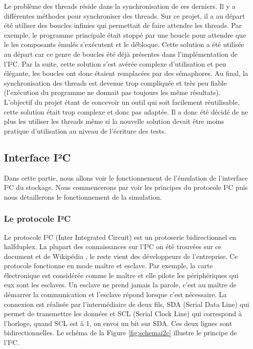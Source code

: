 \documentclass[a4paper]{article}
\begin{document}
Le problème des threads réside dans la synchronisation de ces derniers. Il y a
différentes méthodes pour synchroniser des threads. Sur ce projet, il a au
départ été utiliser des boucles infinies qui permettait de faire attendre les
threads. Par exemple, le programme principale était stoppé par une boucle pour
attendre que le les composants émulés s'exécutent et le débloque. Cette solution
a été utilisée au départ car ce genre de boucles été déjà présentes dans
l'implémentation de l'I²C. Par la suite, cette solution s'est avérée complexe
d'utilisation et peu élégante, les boucles ont donc étaient remplacées par des %
sémaphores. Au final, la synchronisation des threads est devenue trop compliquée
et très peu fiable (l'exécution du programme ne donnait pas toujours les même
résultats). L'objectif du projet étant de concevoir un outil qui soit facilement
réutilisable, cette solution était trop complexe et donc pas adaptée. Il a donc
été décidé de ne plus les utiliser les threads même si la nouvelle solution
devait être moins pratique d'utilisation au niveau de l'écriture des tests.
\subsection{Interface I²C}%

Dans cette partie, nous allons voir le fonctionnement de l'émulation de
l'interface I²C du stockage. Nous commencerons par voir les principes du
protocole I²C puis nous détaillerons le fonctionnement de la simulation.

\subsubsection*{Le protocole I²C}

Le protocole I²C (Inter Integrated Circuit) est un \gls{protoserie}
bidirectionnel en \gls{halfduplex}. La plupart des connaissances sur l'I²C on
été trouvées sur ce document \cite{mankar2014review} et de Wikipédia
\cite{frwiki:197726464}, le reste vient des développeurs de l'entreprise. Ce
protocole fonctionne en mode maître et esclave. Par exemple, la carte
électronique est considérée comme le maître et elle pilote les périphériques qui
eux sont les esclaves. Un esclave ne prend jamais la parole, c'est au maître de
démarrer la communication et l'esclave répond lorsque c'est nécessaire. La
connexion est réalisée par l'intermédiaire de deux fils, SDA (Serial Data Line)
qui permet de transmettre les données et SCL (Serial Clock Line) qui correspond
à l'horloge, quand SCL est à 1, on envoi un bit sur SDA. Ces deux lignes sont
bidirectionnelles. Le schéma de la Figure \ref{fig:schemai2c} illustre le
principe de l'I²C.
\end{document}
